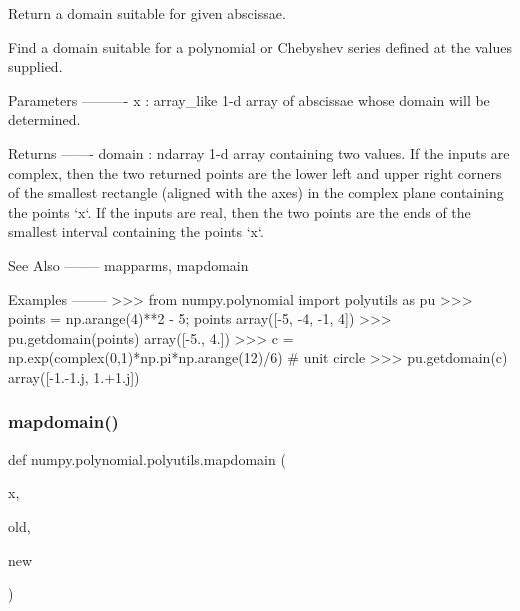 \begin{DoxyVerb}Return a domain suitable for given abscissae.

Find a domain suitable for a polynomial or Chebyshev series
defined at the values supplied.

Parameters
----------
x : array_like
    1-d array of abscissae whose domain will be determined.

Returns
-------
domain : ndarray
    1-d array containing two values.  If the inputs are complex, then
    the two returned points are the lower left and upper right corners
    of the smallest rectangle (aligned with the axes) in the complex
    plane containing the points `x`. If the inputs are real, then the
    two points are the ends of the smallest interval containing the
    points `x`.

See Also
--------
mapparms, mapdomain

Examples
--------
>>> from numpy.polynomial import polyutils as pu
>>> points = np.arange(4)**2 - 5; points
array([-5, -4, -1,  4])
>>> pu.getdomain(points)
array([-5.,  4.])
>>> c = np.exp(complex(0,1)*np.pi*np.arange(12)/6) # unit circle
>>> pu.getdomain(c)
array([-1.-1.j,  1.+1.j])\end{DoxyVerb}
 \mbox{\label{namespacenumpy_1_1polynomial_1_1polyutils_a5b4204c95349493afebe041e44a82585}} 
\subsubsection{\texorpdfstring{mapdomain()}{mapdomain()}}
{\footnotesize\ttfamily def numpy.\+polynomial.\+polyutils.\+mapdomain (\begin{DoxyParamCaption}\item[{}]{x,  }\item[{}]{old,  }\item[{}]{new }\end{DoxyParamCaption})}

